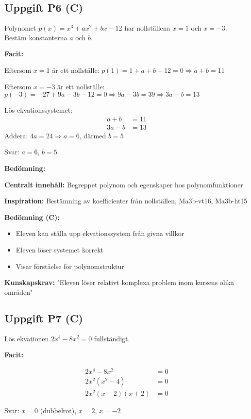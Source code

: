 \documentclass[12pt]{article}
\begin{document}
\subsection*{Uppgift P6 (C)}
Polynomet $p(x) = x^3 + ax^2 + bx - 12$ har nollställena $x = 1$ och $x = -3$. Bestäm konstanterna $a$ och $b$.

\begin{facitbox}
\textbf{Facit:}

Eftersom $x = 1$ är ett nollställe: $p(1) = 1 + a + b - 12 = 0 \Rightarrow a + b = 11$

Eftersom $x = -3$ är ett nollställe: $p(-3) = -27 + 9a - 3b - 12 = 0 \Rightarrow 9a - 3b = 39 \Rightarrow 3a - b = 13$

Lös ekvationssystemet:
\begin{align*}
a + b &= 11 \\
3a - b &= 13
\end{align*}
Addera: $4a = 24 \Rightarrow a = 6$, därmed $b = 5$

Svar: $a = 6$, $b = 5$
\end{facitbox}

\begin{refbox}
\textbf{Bedömning:}

\textbf{Centralt innehåll:} Begreppet polynom och egenskaper hos polynomfunktioner

\textbf{Inspiration:} Bestämning av koefficienter från nollställen, Ma3b-vt16, Ma3b-ht15

\textbf{Bedömning (C):}
\begin{itemize}
    \item Eleven kan ställa upp ekvationssystem från givna villkor
    \item Eleven löser systemet korrekt
    \item Visar förståelse för polynomstruktur
\end{itemize}

\textbf{Kunskapskrav:} "Eleven löser relativt komplexa problem inom kursens olika områden"
\end{refbox}

\subsection*{Uppgift P7 (C)}
Lös ekvationen $2x^4 - 8x^2 = 0$ fullständigt.

\begin{facitbox}
\textbf{Facit:}

\begin{align*}
2x^4 - 8x^2 &= 0 \\
2x^2(x^2 - 4) &= 0 \\
2x^2(x - 2)(x + 2) &= 0
\end{align*}

Svar: $x = 0$ (dubbelrot), $x = 2$, $x = -2$
\end{facitbox}
\end{document}
